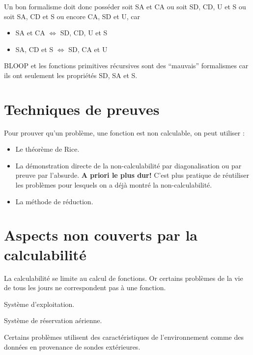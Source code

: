Un bon formalisme doit donc posséder soit SA et CA ou soit SD, CD, U et S ou soit SA, CD et S ou encore CA, SD et U, car
\begin{itemize}
	\item SA et CA $\iff$ SD, CD, U et S
	\item SA, CD et S $\iff$ SD, CA et U
\end{itemize}
BLOOP et les fonctions primitives récursives sont des ``mauvais'' formalismes car ils ont seulement les propriétés SD, SA et S.

\section{Techniques de preuves}
\label{sub:techniques_de_preuve}

Pour prouver qu'un problème, une fonction est non calculable, on peut utiliser :
\begin{itemize}
	\item Le théorème de Rice.
	\item La démonstration directe de la non-calculabilité par 
  diagonalisation ou par preuve par l'absurde. 
  \textbf{A priori le plus dur!} C'est plus pratique de réutiliser les problèmes pour lesquels on a déjà montré la non-calculabilité.
	\item La méthode de réduction.
\end{itemize}

\section{Aspects non couverts par la calculabilité}
\label{sub:aspects_non_couvert_par_la_calculabilit_}
La calculabilité se limite au calcul de fonctions. Or certains problèmes de la vie de tous les jours ne correspondent pas à une fonction.

\begin{myexem}
Système d'exploitation.
\end{myexem}

\begin{myexem}
Système de réservation aérienne.
\end{myexem}

\begin{myexem}
Certains problèmes utilisent des caractéristiques de l'environnement comme des données en provenance de sondes extérieures.
\end{myexem}

